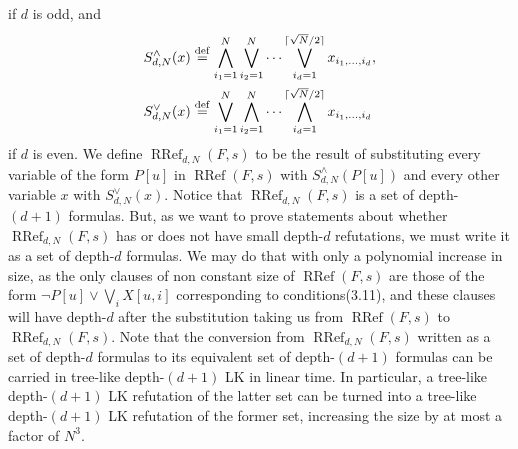 \documentclass[10pt,a4paper]{article}
\newcommand{\RRef}{\operatorname{RRef}}
\begin{document}
if $d$ is odd, and
\begin{align*}
S_{d,N}^{\wedge}(x)&\stackrel{\rm def}=\bigwedge_{i_1=1}^N\bigvee_{i_2=1}^N\cdots\bigvee_{i_d=1}^{\lceil\sqrt N/2\rceil}x_{i_1,\ldots,i_d},\\
S_{d,N}^{\vee}(x)&\stackrel{\rm def}=\bigvee_{i_1=1}^N\bigwedge_{i_2=1}^N\cdots\bigwedge_{i_d=1}^{\lceil\sqrt N/2\rceil}x_{i_1,\ldots,i_d}
\end{align*}
if $d$ is even.
We define $\RRef_{d,N}(F,s)$ to be the result of substituting every variable of the form $P[u]$ in $\RRef(F,s)$ with $S_{d,N}^{\wedge}(P[u])$ and every other variable $x$ with $S_{d,N}^{\vee}(x)$. Notice that $\RRef_{d,N}(F,s)$ is a set of depth-$(d+1)$ formulas. But, as we want to prove statements about whether $\RRef_{d,N}(F,s)$ has or does not have small depth-$d$ refutations, we must write it as a set of depth-$d$ formulas. We may do that with only a polynomial increase in size, as the only clauses of non constant size of $\RRef(F,s)$ are those of the form $\neg P[u]\vee\bigvee_i X[u,i]$ corresponding to conditions(3.11), and these clauses will have depth-$d$ after the substitution taking us from $\RRef(F,s)$ to $\RRef_{d,N}(F,s)$. Note that the conversion from $\RRef_{d,N}(F,s)$ written as a set of depth-$d$ formulas to its equivalent set of depth-$(d+1)$ formulas can be carried in tree-like depth-$(d+1)$ LK in linear time. In particular, a tree-like depth-$(d+1)$ LK refutation of the latter set can be turned into a tree-like depth-$(d+1)$ LK refutation of the former set, increasing the size by at most a factor of $N^3$.
\end{document}
